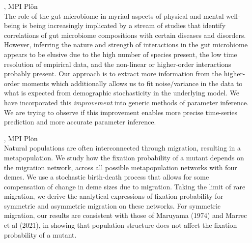 \documentclass[12pt,a4paper]{article}
\begin{document}
, MPI Plön \\[2ex] The role of the gut microbiome in myriad aspects of physical and mental well-being is being increasingly implicated by a stream of studies that identify correlations of gut microbiome compositions with certain diseases and disorders. However, inferring the nature and strength of interactions in the gut microbiome appears to be elusive due to the high number of species present, the low time resolution of empirical data, and the non-linear or higher-order interactions probably present. Our approach is to extract more information from the higher-order moments which additionally allows us to fit noise/variance in the data to what is expected from demographic stochasticity in the underlying model. We have incorporated this {\em improvement} into generic methods of parameter inference. We are trying to observe if this improvement enables more precise time-series prediction and more accurate parameter inference. 

\bigskip\bigskip

, MPI Plön \\[2ex] Natural populations are often interconnected through migration, resulting in a metapopulation. We study how the fixation probability of a mutant depends on the migration network, across all possible metapopulation networks with four demes. We use a stochastic birth-death process that allows for some compensation of change in deme sizes due to migration. Taking the limit of rare migration, we derive the analytical expressions of fixation probability for symmetric and asymmetric migration on these networks. For symmetric migration, our results are consistent with those of Maruyama (1974) and Marrec et al (2021), in showing that population structure does not affect the fixation probability of a mutant. 
\end{document}
